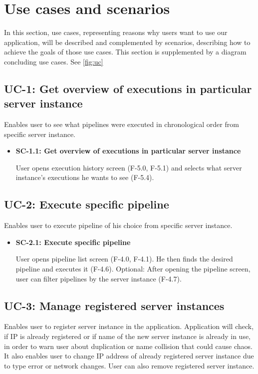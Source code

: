 \section{Use cases and scenarios}
In this section, use cases, representing reasons why users want to use our application, will be described and complemented by scenarios, describing how to achieve the goals of those use cases.
This section is supplemented by a diagram concluding use cases.
See \autoref{fig:uc}

\subsection*{UC-1: Get overview of executions in particular server instance}
Enables user to see what pipelines were executed in chronological order from specific server instance.

\begin{itemize}
\item \textbf{SC-1.1: Get overview of executions in particular server instance}

User opens execution history screen (F-5.0, F-5.1) and selects what server instance's executions he wants to see (F-5.4).
\end{itemize}


\subsection*{UC-2: Execute specific pipeline}
Enables user to execute pipeline of his choice from specific server instance.

\begin{itemize}
\item \textbf{SC-2.1: Execute specific pipeline}

User opens pipeline list screen (F-4.0, F-4.1). He then finds the desired pipeline and executes it (F-4.6). Optional: After opening the pipeline screen, user can filter pipelines by the server instance (F-4.7).
\end{itemize}


\subsection*{UC-3: Manage registered server instances}
Enables user to register server instance in the application. Application will check, if IP is already registered or if name of the new server instance is already in use, in order to warn user about duplication or name collision that could cause chaos. It also enables user to change IP address of already registered server instance due to type error or network changes. User can also remove registered server instance.

